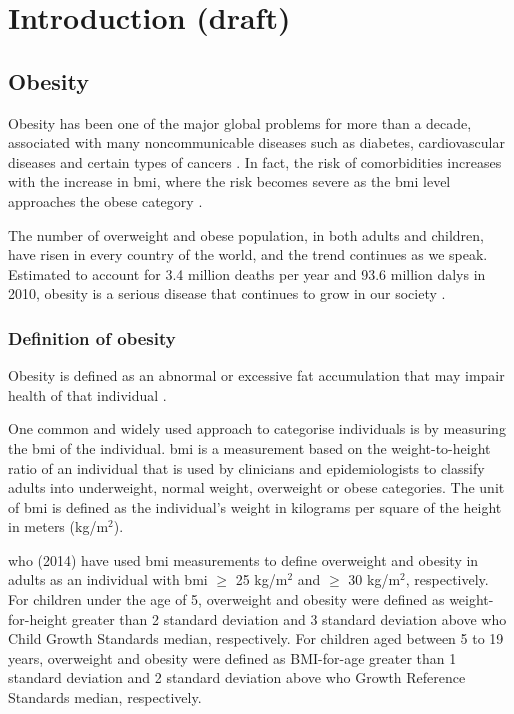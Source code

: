 \chapter{Introduction (draft)}
\label{ch:intro}


\section{Obesity}
\label{sec:obesity}

Obesity has been one of the major global problems for more than a decade, associated with many noncommunicable diseases such as diabetes, cardiovascular diseases and certain types of cancers \citep{WHO2014}.
In fact, the risk of comorbidities increases with the increase in \gls{bmi}, where the risk becomes severe as the \gls{bmi} level approaches the obese category \citep{WHO2000}.

The number of overweight and obese population, in both adults and children, have risen in every country of the world, and the trend continues as we speak.
Estimated to account for 3.4 million deaths per year and 93.6 million \glspl{daly} in 2010, obesity is a serious disease that continues to grow in our society \citep{Lim2012}.

\subsection{Definition of obesity}
\label{sub:definition_of_obesity}

Obesity is defined as an abnormal or excessive fat accumulation that may impair health of that individual \citep{Garrow1988}.

One common and widely used approach to categorise individuals is by measuring the \gls{bmi} of the individual.
\gls{bmi} is a measurement based on the weight-to-height ratio of an individual that is used by clinicians and epidemiologists to classify adults into underweight, normal weight, overweight or obese categories.
The unit of \gls{bmi} is defined as the individual's weight in kilograms per square of the height in meters (kg/m$^2$).

\gls{who} (2014) have used \gls{bmi} measurements to define overweight and obesity in adults as an individual with \gls{bmi} $\geq$ 25 kg/m$^2$ and $\geq$ 30 kg/m$^2$, respectively.
For children under the age of 5, overweight and obesity were defined as weight-for-height greater than 2 standard deviation and 3 standard deviation above \gls{who} Child Growth Standards median, respectively.
For children aged between 5 to 19 years, overweight and obesity were defined as BMI-for-age greater than 1 standard deviation and 2 standard deviation above \gls{who} Growth Reference Standards median, respectively.

